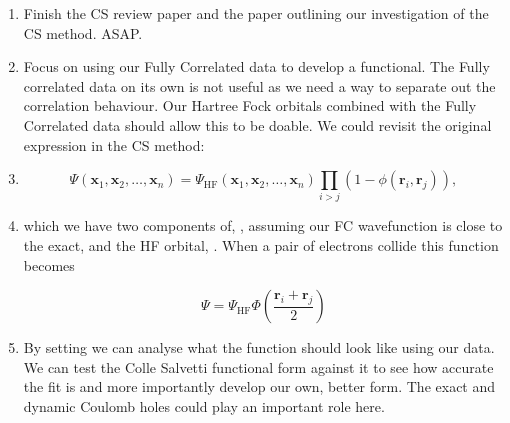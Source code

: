 \documentclass[12pt]{article}
\let\cite=\supercite
\begin{document}
\begin{enumerate}
  \item Finish the CS review paper and the paper outlining our investigation of the CS method. ASAP.
  \item Focus on using our Fully Correlated data to develop a functional. The Fully correlated data on its own is not useful as we need a way to separate out the correlation behaviour. Our Hartree Fock orbitals combined with the Fully Correlated data should allow this to be doable. We could revisit the original expression in the CS method\cite{Colle:1975ke}:
  \item[] 
  \begin{equation}
    \Psi(\mathbf{x}_1, \mathbf{x}_2, \ldots, \mathbf{x}_n) = \Psi_\text{HF}(\mathbf{x}_1, \mathbf{x}_2, \ldots, \mathbf{x}_n)\prod\limits_{i>j}(1-\phi(\mathbf{r}_i, \mathbf{r}_j)), 
  \end{equation}
  \item[] which we have two components of, \m{\Psi}, assuming our FC wavefunction is close to the exact, and the HF orbital, . When a pair of electrons collide this function becomes\cite{Colle:1975ke}
  
  \begin{equation}
    \Psi = \Psi_\text{HF}\Phi\left(\frac{\mathbf{r}_i + \mathbf{r}_j}{2}\right)
  \end{equation}
  \item By setting  we can analyse what the function \m{\Phi} should look like using our data. We can test the Colle Salvetti functional form against it to see how accurate the fit is and more importantly develop our own, better form. The exact and dynamic Coulomb holes could play an important role here. 
\end{enumerate}

\printbibliography
\end{document}

